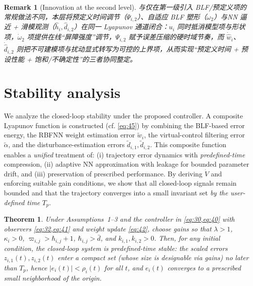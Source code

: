 \documentclass[pdflatex,sn-mathphys-num]{sn-jnl}%
\theoremstyle{thmstyleone}%
\newtheorem{theorem}{Theorem}%
\theoremstyle{thmstyletwo}%
\newtheorem{remark}{Remark}%
\theoremstyle{thmstylethree}%
\begin{document}
\begin{remark}[Innovation at the second level]
与仅在第一级引入 BLF/预定义项的常规做法不同，本层将\emph{预定义时间调节}（$\Psi_{i,2}$）、\emph{自适应 BLF 塑形}（$\omega_2$）与\emph{NN 逼近 + 滑模观测}（$\hat h_i,\hat d_{i,2}$）在同一 Lyapunov 通道闭合：$u_i$ 同时抵消模型项与形状项，$\dot\omega_2$ 项提供在线“屏障强度”调节，$\Psi_{i,2}$ 赋予误差压缩的硬时域节奏，而 $\dot{\hat w}_i$、$\dot{\hat d}_{i,2}$ 则把不可建模项与扰动\emph{显式}转写为可控的上界项，从而实现“预定义时间 + 预设性能 + 饱和/不确定性”的三者协同整定。
\end{remark}




\section{Stability analysis}

We analyze the closed-loop stability under the proposed controller. A composite Lyapunov function is constructed (cf. \cref{eq:45}) by combining the BLF-based error energy, the RBFNN weight estimation error $\tilde w_i$, the virtual-control filtering error $\tilde\alpha$, and the disturbance-estimation errors $\tilde d_{i,1},\tilde d_{i,2}$. This composite function enables a \emph{unified} treatment of: (i) trajectory error dynamics with \emph{predefined-time} compression, (ii) adaptive NN approximation with leakage for bounded parameter drift, and (iii) preservation of prescribed performance. By deriving $\dot V$ and enforcing suitable gain conditions, we show that all closed-loop signals remain bounded and that the trajectory converges into a small invariant set \emph{by the user-defined time} $T_p$.

\begin{theorem}
Under Assumptions~1--3 and the controller in \cref{eq:30,eq:40} with observers \cref{eq:32,eq:41} and weight update \cref{eq:42}, choose gains so that
$\lambda>1$, $\kappa_i>0$, $\varpi_{i,j}>\hbar_{i,j}+1$, $\hbar_{i,j}>\bar d$, and $k_{i,1},k_{i,2}>0$.
Then, for any initial condition, the closed-loop system is \emph{predefined-time stable}: the scaled errors $z_{i,1}(t),z_{i,2}(t)$ enter a compact set (whose size is designable via gains) no later than $T_p$, hence $|e_{i}(t)|<\rho_{i}(t)$ for all $t$, and $e_i(t)$ converges to a prescribed small neighborhood of the origin.
\end{theorem}
\end{document}
